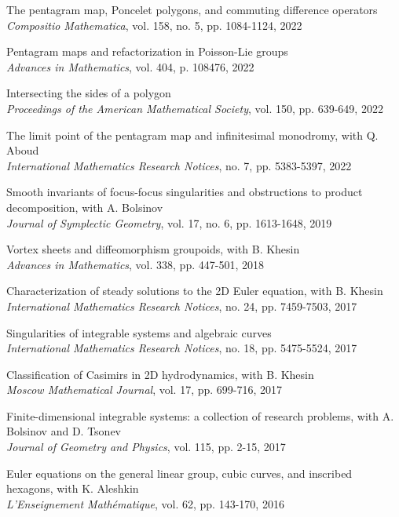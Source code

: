 \documentclass[a4paper, 12pt]{article}
\begin{document}
\begin{compactenum}
 \item {The pentagram map, Poncelet polygons, and commuting difference operators}\\\textit{Compositio Mathematica},  vol. 158, no. 5, pp. 1084-1124, 2022
 \item {Pentagram maps and refactorization in Poisson-Lie groups}\\\textit{Advances in Mathematics}, vol. 404, 
p. 108476,  2022

\item {Intersecting the sides of a polygon}\\\textit{Proceedings of the American Mathematical Society}, vol. 150, pp. 639-649, 2022
\item {The limit point of the pentagram map and infinitesimal monodromy}, with Q.\,Aboud\\\textit{International Mathematics Research Notices}, no. 7, pp. 5383-5397, 2022
\item {Smooth invariants of focus-focus singularities and obstructions to product decomposition}, with
A. Bolsinov\\\textit{Journal of Symplectic Geometry}, vol. 17, no. 6, pp. 1613-1648, 2019
\item {Vortex sheets and diffeomorphism groupoids}, with B. Khesin\\\textit{Advances in Mathematics}, vol. 338, pp. 447-501, 2018
\item {Characterization of steady solutions to the 2D Euler equation}, with B. Khesin\\\textit{International
Mathematics Research Notices},  no. 24, pp. 7459-7503, 2017
\item {Singularities of integrable systems and algebraic curves}\\\textit{International Mathematics Research
Notices},  no. 18, pp. 5475-5524, 2017
\item {Classification of Casimirs in 2D hydrodynamics}, with B. Khesin\\\textit{Moscow Mathematical
Journal}, vol. 17, pp. 699-716, 2017
\item {Finite-dimensional integrable systems: a collection of research problems}, with A. Bolsinov and
D. Tsonev\\\textit{Journal of Geometry and Physics}, vol. 115, pp. 2-15, 2017
\item {Euler equations on the general linear group, cubic curves, and inscribed hexagons}, with
K. Aleshkin\\\textit{L'Enseignement Math\'ematique}, vol. 62, pp. 143-170, 2016 

\end{compactenum}
\end{document}
